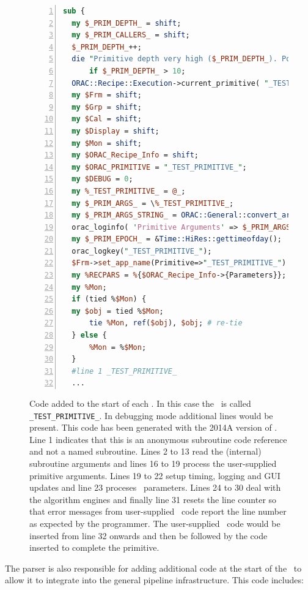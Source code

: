 \documentclass[final,authoryear,5p,times,twocolumn]{elsarticle}
\begin{document}
\begin{figure}[t]
\begin{lstlisting}[language=perl,numbers=left]
sub {
  my $_PRIM_DEPTH_ = shift;
  my $_PRIM_CALLERS_ = shift;
  $_PRIM_DEPTH_++;
  die "Primitive depth very high ($_PRIM_DEPTH_). Possible recursive primitive"
      if $_PRIM_DEPTH_ > 10;
  ORAC::Recipe::Execution->current_primitive( "_TEST_PRIMITIVE_", $_PRIM_CALLERS_);
  my $Frm = shift;
  my $Grp = shift;
  my $Cal = shift;
  my $Display = shift;
  my $Mon = shift;
  my $ORAC_Recipe_Info = shift;
  my $ORAC_PRIMITIVE = "_TEST_PRIMITIVE_";
  my $DEBUG = 0;
  my %_TEST_PRIMITIVE_ = @_;
  my $_PRIM_ARGS_ = \%_TEST_PRIMITIVE_;
  my $_PRIM_ARGS_STRING_ = ORAC::General::convert_args_to_string( %$_PRIM_ARGS_ );
  orac_loginfo( 'Primitive Arguments' => $_PRIM_ARGS_STRING_ );
  my $_PRIM_EPOCH_ = &Time::HiRes::gettimeofday();
  orac_logkey("_TEST_PRIMITIVE_");
  $Frm->set_app_name(Primitive=>"_TEST_PRIMITIVE_") if $Frm->can("set_app_name");
  my %RECPARS = %{$ORAC_Recipe_Info->{Parameters}};
  my %Mon;
  if (tied %$Mon) {
  my $obj = tied %$Mon;
      tie %Mon, ref($obj), $obj; # re-tie
  } else {
      %Mon = %$Mon;
  }
  #line 1 _TEST_PRIMITIVE_
  ...
\end{lstlisting}
  \caption{Code added to the start of each \primitive. In this case
    the \primitive\ is called \texttt{\_TEST\_PRIMITIVE\_}. In
    debugging mode additional lines would be present. This code has
    been generated with the 2014A version of \oracdr. Line 1 indicates
    that this is an anonymous subroutine code reference and not a
    named subroutine. Lines 2 to 13 read the (internal) subroutine
    arguments and lines 16 to 19 process the user-supplied primitive
    arguments. Lines 19 to 22 setup timing, logging and GUI updates
    and line 23 proceses \recipe\ parameters. Lines 24 to 30 deal with
    the algorithm engines and finally line 31 resets the line counter
    so that error messages from user-supplied \primitive\ code report
    the line number as expected by the programmer. The user-supplied
    \primitive\ code would be inserted from line 32 onwards and then
    be followed by the code inserted to complete the primitive.}
\label{fig:primhead}
\end{figure}

The parser is also responsible for adding additional code at the
start of the \primitive\ to allow it to integrate into the general
pipeline infrastructure. This code includes:
\end{document}
